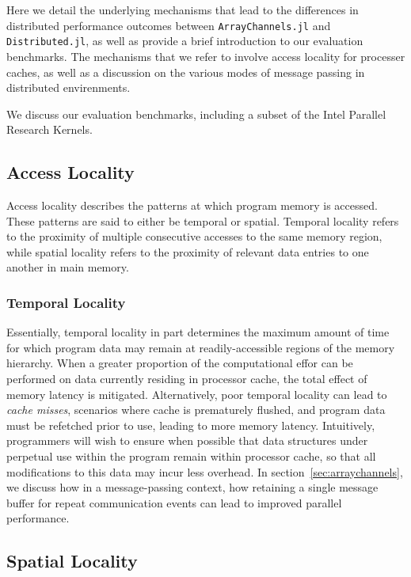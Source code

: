 Here we detail the underlying mechanisms that lead to the differences in
distributed performance outcomes between \texttt{ArrayChannels.jl} and
\texttt{Distributed.jl}, as well as provide a brief introduction to our
evaluation benchmarks. The mechanisms that we refer to involve access
locality for processer caches, as well as a discussion on the various
modes of message passing in distributed envirenments.

We discuss our evaluation benchmarks, including a subset of the Intel
Parallel Research Kernels.

\subsection{Access Locality}
\label{sec:access-locality}

Access locality \cite{patterns} describes the patterns at which program
memory is accessed. These patterns are said to either be temporal or
spatial. Temporal locality refers to the proximity of multiple
consecutive accesses to the same memory region, while spatial locality
refers to the proximity of relevant data entries to one another in main
memory.

\subsubsection{Temporal Locality}
\label{sec:temporal-locality}

Essentially, temporal locality in part determines the maximum amount of
time for which program data may remain at readily-accessible regions of
the memory hierarchy. When a greater proportion of the computational
effor can be performed on data currently residing in processor cache,
the total effect of memory latency is mitigated. Alternatively, poor
temporal locality can lead to \emph{cache misses}, scenarios where cache
is prematurely flushed, and program data must be refetched prior to use,
leading to more memory latency. Intuitively, programmers will wish to
ensure when possible that data structures under perpetual use within the
program remain within processor cache, so that all modifications to this
data may incur less overhead. In section~\ref{sec:arraychannels}, we
discuss how in a message-passing context, how retaining a single message
buffer for repeat communication events can lead to improved parallel
performance.

\subsection{Spatial Locality}
\label{sec:spatial-locality}

